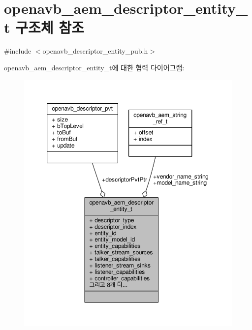 \hypertarget{structopenavb__aem__descriptor__entity__t}{}\section{openavb\+\_\+aem\+\_\+descriptor\+\_\+entity\+\_\+t 구조체 참조}
\label{structopenavb__aem__descriptor__entity__t}


{\ttfamily \#include $<$openavb\+\_\+descriptor\+\_\+entity\+\_\+pub.\+h$>$}



openavb\+\_\+aem\+\_\+descriptor\+\_\+entity\+\_\+t에 대한 협력 다이어그램\+:
\nopagebreak
\begin{figure}[H]
\begin{center}
\leavevmode
\includegraphics[width=350pt]{structopenavb__aem__descriptor__entity__t__coll__graph}
\end{center}
\end{figure}
